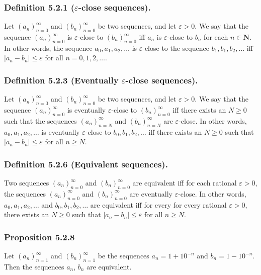 \documentclass[12pt, letter]{article}
\begin{document}
\subsubsection*{Definition 5.2.1 ($\varepsilon$-close sequences).}
Let $(a_n)_{n=0}^\infty$ and $(b_n)_{n=0}^\infty$ be two sequences, and let $\varepsilon>0$. We say that the sequence $(a_n)_{n=0}^\infty$ is $\varepsilon$-close 
to $(b_n)_{n=0}^\infty$ iff $a_n$ is $\varepsilon$-close to $b_n$ for each $n\in\mathbf{N}$. In other words, the sequence $a_0,a_1,a_2,\dotsc$ is $\varepsilon$-close
to the sequence $b_1,b_1,b_2,\dotsc$ iff $|a_n-b_n|\leq\varepsilon$ for all $n=0,1,2,\dotsc$.
\subsubsection*{Definition 5.2.3 (Eventually $\varepsilon$-close sequences).}
Let $(a_n)_{n=0}^\infty$ and $(b_n)_{n=0}^\infty$ be two sequences, and let $\varepsilon>0$. We say that the sequence $(a_n)_{n=0}^\infty$ is eventually $\varepsilon$-close 
to $(b_n)_{n=0}^\infty$ iff there exists an $N\geq 0$ such that the sequences $(a_n)_{n=N}^\infty$ and $(b_n)_{n=N}^\infty$ are $\varepsilon$-close. In other words,
$a_0,a_1,a_2,\dotsc$ is eventually $\varepsilon$-close to $b_0,b_1,b_2,\dotsc$ iff there exists an $N\geq 0$ such that $|a_n-b_n|\leq\varepsilon$ for all $n\geq N$.
\subsubsection*{Definition 5.2.6 (Equivalent sequences).}
Two sequences $(a_n)_{n=0}^\infty$ and $(b_n)_{n=0}^\infty$ are equivalent iff for each rational $\varepsilon>0$, the sequences $(a_n)_{n=0}^\infty$ and 
$(b_n)_{n=0}^\infty$ are eventually $\varepsilon$-close. In other words, $a_0,a_1,a_2,\dotsc$ and $b_0,b_1,b_2,\dotsc$ are equivalent iff for every for every rational $\varepsilon>0$,
there exists an $N\geq 0$ such that $|a_n-b_n|\leq\varepsilon$ for all $n\geq N$.
\subsubsection*{Proposition 5.2.8}
Let $(a_n)_{n=1}^\infty$ and $(b_n)_{n=1}^\infty$ be the sequences $a_n=1+10^{-n}$ and $b_n=1-10^{-n}$. Then the sequences $a_n$, $b_n$ are equivalent.
\end{document}
